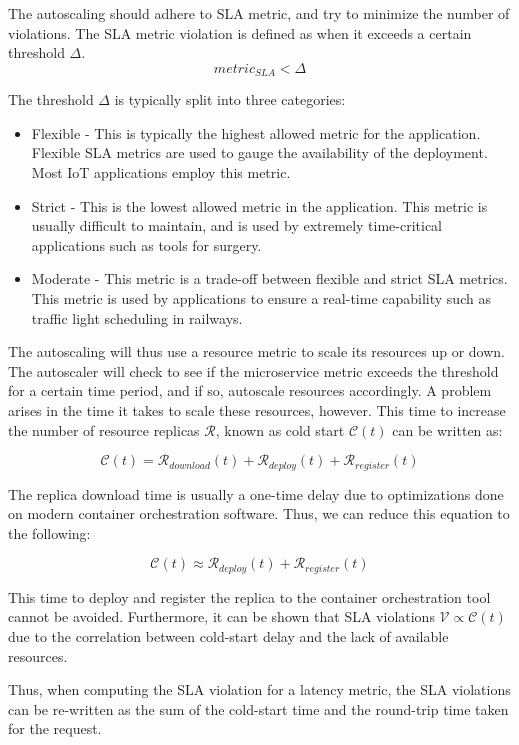 The autoscaling should adhere to SLA metric, and try to minimize the number of violations. The SLA metric violation is defined as when it exceeds a certain threshold $\Delta$.
\[ metric_{SLA} < \Delta \]

The threshold $\Delta$ is typically split into three categories:
\begin{itemize}
    \item Flexible - This is typically the highest allowed metric for the application. Flexible SLA metrics are used to gauge the availability of the deployment. Most IoT applications employ this metric.
    \item Strict - This is the lowest allowed metric in the application. This metric is usually difficult to maintain, and is used by extremely time-critical applications such as tools for surgery.
    \item Moderate - This metric is a trade-off between flexible and strict SLA metrics. This metric is used by applications to ensure a real-time capability such as traffic light scheduling in railways.
\end{itemize}

The autoscaling will thus use a resource metric to scale its resources up or down. The autoscaler will check to see if the microservice metric exceeds the threshold for a certain time period, and if so, autoscale resources accordingly. A problem arises in the time it takes to scale these resources, however. This time to increase the number of resource replicas $\mathcal{R}$, known as cold start $\mathcal{C}(t)$ can be written as:

\[ \mathcal{C}(t) = \mathcal{R}_{download}(t) + \mathcal{R}_{deploy}(t) + \mathcal{R}_{register}(t)\]

The replica download time is usually a one-time delay due to optimizations done on modern container orchestration software. Thus, we can reduce this equation to the following:

\[ \mathcal{C}(t) \approx \mathcal{R}_{deploy}(t) + \mathcal{R}_{register}(t)\]

This time to deploy and register the replica to the container orchestration tool cannot be avoided. Furthermore, it can be shown that SLA violations $\mathcal{V} \propto \mathcal{C}(t)$ due to the correlation between cold-start delay and the lack of available resources.\par

Thus, when computing the SLA violation for a latency metric, the SLA violations can be re-written as the sum of the cold-start time and the round-trip time taken for the request.

